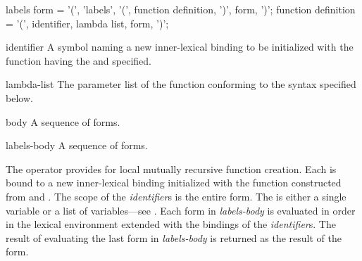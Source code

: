 \begin{optDefinition}
%
\Syntax
\savesyntax{}\vbox{\syntax
labels form
   = '(', 'labels',
          '(', {function definition}, ')',
          {form}, ')';
function definition
   = '(', identifier, lambda list, {form}, ')';
\endsyntax}
%
\begin{arguments}
    \item[identifier] A symbol naming a new inner-lexical binding to be
    initialized with the function having the  and 
    specified.

    \item[lambda-list] The parameter list of the function conforming to the
    syntax specified below.

    \item[body] A sequence of forms.

    \item[labels-body] A sequence of forms.
\end{arguments}
%
\result%
The  operator provides for local mutually recursive function
creation.  Each  is bound to a new inner-lexical binding
initialized with the function constructed from  and .
The scope of the {\em identifier}s is the entire 
form.  The
 is either a single variable or a list of variables---see
.  Each form in {\em labels-body} is evaluated in order in
the lexical environment extended with the bindings of the {\em identifier}s.
The result of evaluating the last form in {\em labels-body}\/ is returned as the
result of the  form.


\end{optDefinition}
